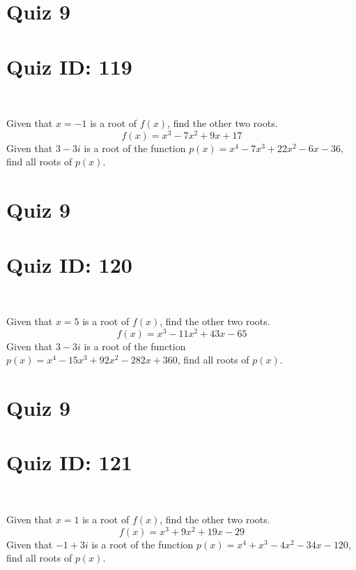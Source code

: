 \documentclass{exam}
\begin{document}
\section*{Quiz 9}
\section*{Quiz ID: 119}
\vspace{0.5cm}\
\vspace{1cm}\
\begin{questions}
\question Given that $x=-1$ is a root of $f(x)$, find the other two roots.\[f(x)=
x^3 - 7x^2 + 9x + 17\]
\newpage
\question Given that $3-3\mathit{i}$ is a root of the function $p(x)=
x^4 - 7x^3 + 22x^2 - 6x - 36$, find all roots of $p(x)$. 
\end{questions}\newpage
\newpage
\section*{Quiz 9}
\section*{Quiz ID: 120}
\vspace{0.5cm}\
\vspace{1cm}\
\begin{questions}
\question Given that $x=5$ is a root of $f(x)$, find the other two roots.\[f(x)=
x^3 - 11x^2 + 43x - 65\]
\newpage
\question Given that $3-3\mathit{i}$ is a root of the function $p(x)=
x^4 - 15x^3 + 92x^2 - 282x + 360$, find all roots of $p(x)$. \makeemptybox{\stretch{1}}
\end{questions}\newpage
\newpage
\section*{Quiz 9}
\section*{Quiz ID: 121}
\vspace{0.5cm}\
\vspace{1cm}\
\begin{questions}
\question Given that $x=1$ is a root of $f(x)$, find the other two roots.\[f(x)=
x^3 + 9x^2 + 19x - 29\]
\newpage
\question Given that $-1+3\mathit{i}$ is a root of the function $p(x)=
x^4 + x^3 - 4x^2 - 34x - 120$, find all roots of $p(x)$. \makeemptybox{\stretch{1}}
\end{questions}\newpage
\newpage
\end{document}
